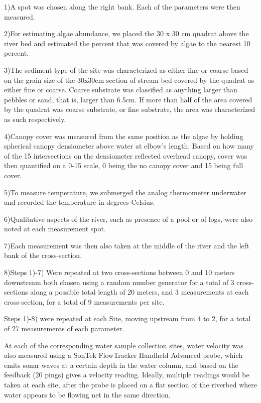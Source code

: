 \documentclass{article}\usepackage[]{graphicx}\usepackage[]{color}
\begin{document}
1)A spot was chosen along the right bank. Each of the parameters were then measured.

2)For estimating algae abundance, we placed the 30  x 30 cm quadrat above the river bed and estimated
the percent that was covered by algae to the nearest 10 percent.

3)The sediment type of the site was characterized as either fine or coarse based on the grain size of the 30x30cm section of stream bed covered by the quadrat as either fine or coarse. Coarse substrate was classified as anything larger than pebbles or sand, that is, larger than 6.5cm. If more than half of the area covered by the quadrat was coarse substrate, or fine substrate, the area was characterized as such respectively.

4)Canopy cover was measured from the same position as the algae by holding spherical canopy densiometer above water at elbow’s length. Based on how many of the 15 intersections on the densiometer reflected overhead canopy, cover was then quantified on a 0-15 scale, 0 being the no canopy cover and 15 being full cover.

5)To measure temperature, we submerged the analog thermometer underwater and recorded the temperature in degrees Celsius.

6)Qualitative aspects of the river, such as presence of a pool or of logs, were also noted at each measurement spot.

7)Each measurement was then also taken at the middle of the river and the left bank of the cross-section. 

8)Steps 1)-7) Were repeated at two cross-sections between 0 and 10 meters downstream both chosen using a random number generator for a total of 3 cross-sections along a possible total length of 20 meters, and 3 measurements at each cross-section, for a total of 9 measurements per site. 


Steps 1)-8) were repeated at each Site, moving upstream from 4 to 2, for a total of 27 measurements of each parameter.



At each of the corresponding water sample collection sites, water velocity was also measured using a SonTek FlowTracker Handheld Advanced probe, which emits sonar waves at a certain depth in the water column, and based on the feedback (20 pings) gives a velocity reading. Ideally, multiple readings would be taken at each site, after the probe is placed on a flat section of the riverbed where water appears to be flowing net in the same direction. 
\end{document}
